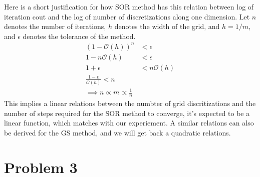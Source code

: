\documentclass[]{article}
\begin{document}
    \par
    Here is a short justification for how SOR method has this relation between log of iteration cout and the log of number of discretizations along one dimension. Let $n$ denotes the number of iterations, $h$ denotes the width of the grid, and $h = 1/m$, and $\epsilon$ denotes the tolerance of the method. 
    \begin{align*}\tag{2.1}\label{eqn:2.1}
        (1 - \mathcal{O}(h))^n &< \epsilon
        \\
        1 - n\mathcal{O}(h) &<  \epsilon
        \\
        1 + \epsilon &< n\mathcal{O}(h)
        \\
        \frac{1 - \epsilon}{\mathcal{O}(h)} < n
        \\
        \implies n \propto m \propto \frac{1}{n}
    \end{align*}
    This implies a linear relations between the numbter of grid discritizations and the number of steps required for the SOR method to converge, it's expected to be a linear function, which matches with our experiement. A similar relations can also be derived for the GS method, and we will get back a quadratic relations. 
    
\section*{Problem 3}
    
\end{document}

